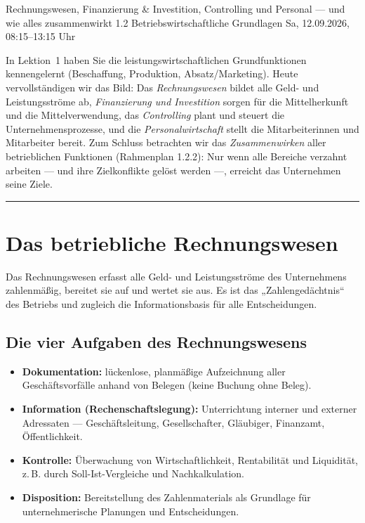 \documentclass[11pt, a4paper]{article}
\begin{document}
%
  {Rechnungswesen, Finanzierung \& Investition, Controlling und Personal --- und wie alles zusammenwirkt}%
  {1.2 Betriebswirtschaftliche Grundlagen}%
  {Sa, 12.09.2026, 08:15--13:15 Uhr}

\begin{merksatz}[title={\bfseries Worum geht es in dieser Lektion?}]
In Lektion~1 haben Sie die leistungswirtschaftlichen Grundfunktionen kennengelernt
(Beschaffung, Produktion, Absatz/Marketing). Heute vervollständigen wir das Bild: Das
\emph{Rechnungswesen} bildet alle Geld- und Leistungsströme ab, \emph{Finanzierung und
Investition} sorgen für die Mittelherkunft und die Mittelverwendung, das \emph{Controlling}
plant und steuert die Unternehmensprozesse, und die \emph{Personalwirtschaft} stellt die
Mitarbeiterinnen und Mitarbeiter bereit. Zum Schluss betrachten wir das
\emph{Zusammenwirken} aller betrieblichen Funktionen (Rahmenplan 1.2.2): Nur wenn alle
Bereiche verzahnt arbeiten --- und ihre Zielkonflikte gelöst werden ---, erreicht das
Unternehmen seine Ziele.
\end{merksatz}

\tableofcontents
\vspace{1em}
\hrule
\vspace{1em}

\section{Das betriebliche Rechnungswesen}

Das Rechnungswesen erfasst alle Geld- und Leistungsströme des Unternehmens zahlenmäßig,
bereitet sie auf und wertet sie aus. Es ist das „Zahlengedächtnis`` des Betriebs und
zugleich die Informationsbasis für alle Entscheidungen.

\subsection{Die vier Aufgaben des Rechnungswesens}

\begin{itemize}
  \item \textbf{Dokumentation:} lückenlose, planmäßige Aufzeichnung aller
    Geschäftsvorfälle anhand von Belegen (keine Buchung ohne Beleg).
  \item \textbf{Information (Rechenschaftslegung):} Unterrichtung interner und externer
    Adressaten --- Geschäftsleitung, Gesellschafter, Gläubiger, Finanzamt, Öffentlichkeit.
  \item \textbf{Kontrolle:} Überwachung von Wirtschaftlichkeit, Rentabilität und
    Liquidität, z.\,B. durch Soll-Ist-Vergleiche und Nachkalkulation.
  \item \textbf{Disposition:} Bereitstellung des Zahlenmaterials als Grundlage für
    unternehmerische Planungen und Entscheidungen.
\end{itemize}
\end{document}

